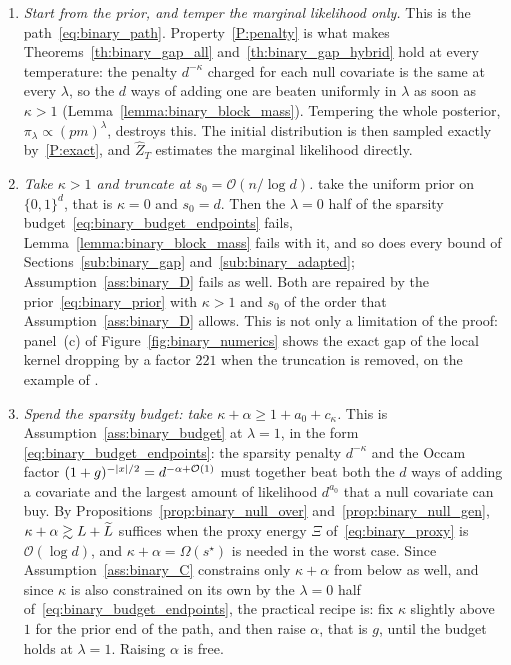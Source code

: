 \documentclass[aos]{imsart}%
\DeclarePairedDelimiter{\abs}{\lvert}{\rvert}
\newcommand{\OO}{\mathcal{O}}  %
\theoremstyle{plain}
\theoremstyle{definition}
\begin{document}
    \begin{enumerate}[leftmargin=2.2em]
        \item \emph{Start from the prior, and temper the marginal likelihood
        only.} This is the path~\eqref{eq:binary_path}. Property~\ref{P:penalty}
        is what makes Theorems~\ref{th:binary_gap_all}
        and~\ref{th:binary_gap_hybrid} hold at every temperature: the penalty
        $d^{-\kappa}$ charged for each null covariate is the same at every
        $\lambda$, so the $d$ ways of adding one are beaten uniformly in
        $\lambda$ as soon as $\kappa>1$
        (Lemma~\ref{lemma:binary_block_mass}). Tempering the whole posterior,
        $\pi_\lambda\propto(pm)^{\lambda}$, destroys this. The initial
        distribution is then sampled exactly by~\ref{P:exact}, and
        $\widehat Z_T$ estimates the marginal likelihood directly.

        \item \emph{Take $\kappa>1$ and truncate at $s_0=\OO(n/\log d)$.}
        \citet{Schafer2013-yq} take the uniform prior on $\{0,1\}^{d}$, that is
        $\kappa=0$ and $s_0=d$. Then the $\lambda=0$ half of the sparsity
        budget~\eqref{eq:binary_budget_endpoints} fails,
        Lemma~\ref{lemma:binary_block_mass} fails with it, and so does every
        bound of Sections~\ref{sub:binary_gap} and~\ref{sub:binary_adapted};
        Assumption~\ref{ass:binary_D} fails as well. Both are repaired by the
        prior~\eqref{eq:binary_prior} with $\kappa>1$ and $s_0$ of the order
        that Assumption~\ref{ass:binary_D} allows. This is not only a
        limitation of the proof: panel~(c) of
        Figure~\ref{fig:binary_numerics} shows the exact gap of the local
        kernel dropping by a factor $221$ when the truncation is removed, on
        the example of \citet[Appendix~B]{YangWainwrightJordan2016}.

        \item \emph{Spend the sparsity budget: take
        $\kappa+\alpha\geq1+a_0+c_\kappa$.} This is
        Assumption~\ref{ass:binary_budget} at $\lambda=1$, in the form
        \eqref{eq:binary_budget_endpoints}: the sparsity penalty $d^{-\kappa}$
        and the Occam factor $(1+g)^{-\abs x/2}=d^{-\alpha+\OO(1)}$ must
        together beat both the $d$ ways of adding a covariate and the largest
        amount of likelihood $d^{a_0}$ that a null covariate can buy. By
        Propositions~\ref{prop:binary_null_over}
        and~\ref{prop:binary_null_gen}, $\kappa+\alpha\gtrsim L+\widetilde{L}$ suffices
        when the proxy energy $\Xi$ of~\eqref{eq:binary_proxy} is $\OO(\log
        d)$, and $\kappa+\alpha=\Omega(s^{\star})$ is needed in the worst case.
        Since Assumption~\ref{ass:binary_C} constrains only $\kappa+\alpha$
        from below as well, and since $\kappa$ is also constrained on its own
        by the $\lambda=0$ half of~\eqref{eq:binary_budget_endpoints}, the
        practical recipe is: fix $\kappa$ slightly above $1$ for the prior end
        of the path, and then raise $\alpha$, that is $g$, until the budget
        holds at $\lambda=1$. Raising $\alpha$ is free.


\end{enumerate}
\end{document}
